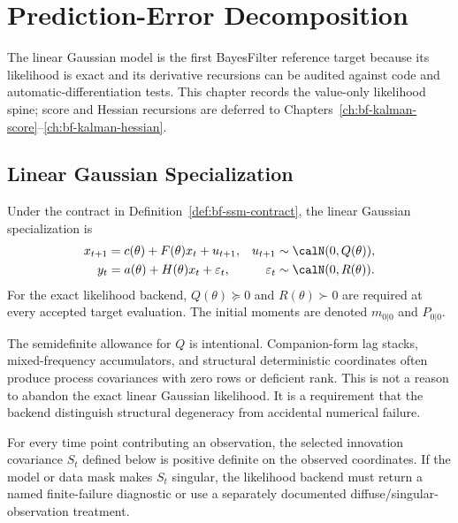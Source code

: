 \chapter{Prediction-Error Decomposition}
\label{ch:bf-prediction-error-decomposition}

The linear Gaussian model is the first BayesFilter reference target because its
likelihood is exact and its derivative recursions can be audited against code
and automatic-differentiation tests.  This chapter records the value-only
likelihood spine; score and Hessian recursions are deferred to
Chapters~\ref{ch:bf-kalman-score}--\ref{ch:bf-kalman-hessian}.

\section{Linear Gaussian Specialization}
\label{sec:bf-lgssm-specialization}

Under the contract in Definition~\ref{def:bf-ssm-contract}, the linear Gaussian
specialization is
\begin{align}
  x_{t+1} &= c(\theta) + F(\theta)x_t + u_{t+1},
  & u_{t+1} &\sim \calN(0,Q(\theta)), \label{eq:bf-lgssm-state} \\
  y_t &= a(\theta) + H(\theta)x_t + \varepsilon_t,
  & \varepsilon_t &\sim \calN(0,R(\theta)). \label{eq:bf-lgssm-observation}
\end{align}
For the exact likelihood backend, $Q(\theta)\succeq 0$ and
$R(\theta)\succ 0$ are required at every accepted target evaluation.  The
initial moments are denoted $m_{0|0}$ and $P_{0|0}$.

The semidefinite allowance for $Q$ is intentional.  Companion-form lag stacks,
mixed-frequency accumulators, and structural deterministic coordinates often
produce process covariances with zero rows or deficient rank.  This is not a
reason to abandon the exact linear Gaussian likelihood.  It is a requirement
that the backend distinguish structural degeneracy from accidental numerical
failure.

\begin{assumption}
\label{asm:bf-innovation-regularity}
For every time point contributing an observation, the selected innovation
covariance $S_t$ defined below is positive definite on the observed
coordinates.  If the model or data mask makes $S_t$ singular, the likelihood
backend must return a named finite-failure diagnostic or use a separately
documented diffuse/singular-observation treatment.
\end{assumption}

